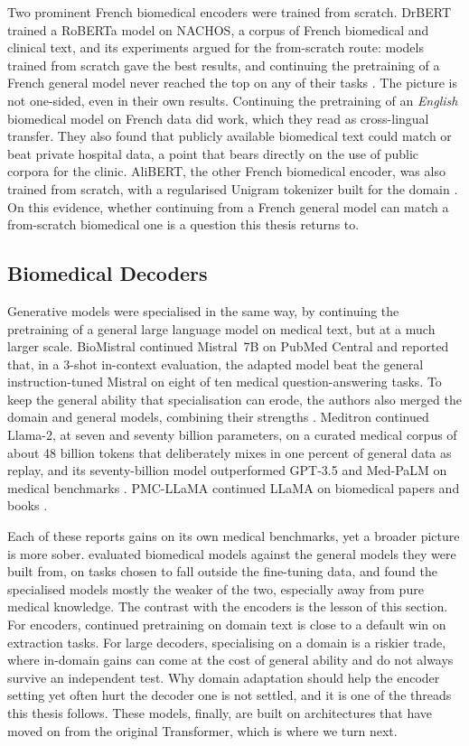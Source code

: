 Two prominent French biomedical encoders were trained from scratch. DrBERT
trained a RoBERTa model on NACHOS, a corpus of French biomedical and clinical text, and
its experiments argued for the from-scratch route: models trained from scratch gave the
best results, and continuing the pretraining of a French general model never reached the
top on any of their tasks \citep{labrak2023drbert}. The picture is not one-sided, even
in their own results. Continuing the pretraining of an \emph{English} biomedical
model on French data did work, which they read as cross-lingual transfer. They also found
that publicly available biomedical text could match or beat private hospital data, a
point that bears directly on the use of public corpora for the clinic. AliBERT, the other
French biomedical encoder, was also trained from scratch, with a regularised Unigram
tokenizer built for the domain \citep{berhe:hal-03911564}. On this evidence, whether
continuing from a French general model can match a from-scratch biomedical one is a
question this thesis returns to.

\subsection{Biomedical Decoders}

Generative models were specialised in the same way, by continuing the pretraining of a
general large language model on medical text, but at a much larger scale. BioMistral
continued Mistral~7B on PubMed Central and reported that, in a 3-shot in-context evaluation, the
adapted model beat the general instruction-tuned Mistral on eight of ten medical question-answering tasks. To
keep the general ability that specialisation can erode, the authors also merged the
domain and general models, combining their strengths \citep{labrak-etal-2024-biomistral}.
Meditron continued Llama-2, at seven and seventy billion parameters, on a curated
medical corpus of about 48 billion tokens that deliberately mixes in one percent of
general data as replay, and its seventy-billion model outperformed GPT-3.5 and Med-PaLM
on medical benchmarks \citep{chen2023meditron}. PMC-LLaMA continued LLaMA on biomedical
papers and books \citep{wu2024pmcllama}.

Each of these reports gains on its own medical benchmarks, yet a broader picture is more
sober. \citet{dorfner2024biomedical} evaluated biomedical models against the general
models they were built from, on tasks chosen to fall outside the fine-tuning data, and
found the specialised models mostly the weaker of the two, especially away from pure medical
knowledge. The contrast with the encoders is the lesson of this section. For encoders,
continued pretraining on domain text is close to a default win on extraction tasks. For
large decoders, specialising on a domain is a riskier trade, where in-domain gains can
come at the cost of general ability and do not always survive an independent test. Why
domain adaptation should help the encoder setting yet often hurt the decoder one is not
settled, and it is one of the threads this thesis follows. These models, finally, are built on architectures that have
moved on from the original Transformer, which is where we turn next.
